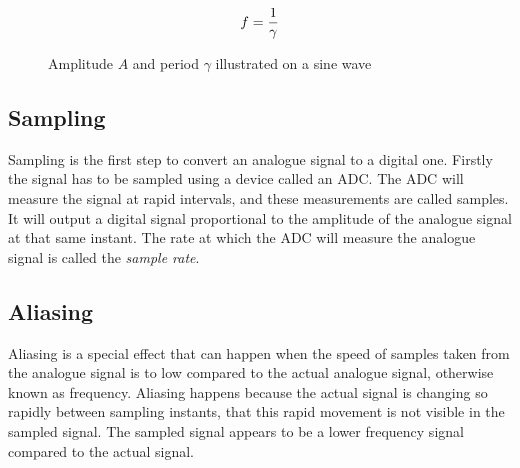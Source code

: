 \begin{equation}
    \centering
    f = \frac{1}{\gamma}
    \label{eq:Frequency}
\end{equation}

\begin{figure}[htbp]
	\centering
	\caption{Amplitude $A$ and period $\gamma$ illustrated on a sine wave}
	\label{fig:Amplitude-Wavelenght}
\end{figure}

\subsection{Sampling}
\label{sub:Sampling}
Sampling is the first step to convert an analogue signal to a digital one. Firstly the signal has to be sampled using a device called an \gls{ADC}. The \gls{ADC} will measure the signal at rapid intervals, and these measurements are called samples. It will output a digital signal proportional to the amplitude of the analogue signal at that same instant. The rate at which the \gls{ADC} will measure the analogue signal is called the \textit{sample rate}.

\subsection{Aliasing}
\label{sub:Aliasing}
Aliasing is a special effect that can happen when the speed of samples taken from the analogue signal is to low compared to the actual analogue signal, otherwise known as frequency. Aliasing happens because the actual signal is changing so rapidly between sampling instants, that this rapid movement is not visible in the sampled signal. The sampled signal appears to be a lower frequency signal compared to the actual signal.

